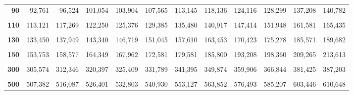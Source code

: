 \documentclass[
  11pt,
  ngerman,
  a4paper,
]{report}
\begin{document}
\begin{table}[H]
{\begin{tabular}{>{}r|rrrrrrrrrrr}
\textbf{90} & 92,761 & 96,524 & 101,054 & 103,904 & 107,565 & 113,145 & 118,136 & 124,116 & 128,299 & 137,208 & 140,782\\
\addlinespace
\textbf{\cellcolor{gray!6}{100}} & \cellcolor{gray!6}{102,946} & \cellcolor{gray!6}{106,906} & \cellcolor{gray!6}{111,667} & \cellcolor{gray!6}{114,659} & \cellcolor{gray!6}{118,498} & \cellcolor{gray!6}{124,342} & \cellcolor{gray!6}{129,561} & \cellcolor{gray!6}{135,807} & \cellcolor{gray!6}{140,169} & \cellcolor{gray!6}{149,449} & \cellcolor{gray!6}{153,167}\\
\textbf{110} & 113,121 & 117,269 & 122,250 & 125,376 & 129,385 & 135,480 & 140,917 & 147,414 & 151,948 & 161,581 & 165,435\\
\textbf{\cellcolor{gray!6}{120}} & \cellcolor{gray!6}{123,289} & \cellcolor{gray!6}{127,616} & \cellcolor{gray!6}{132,806} & \cellcolor{gray!6}{136,062} & \cellcolor{gray!6}{140,233} & \cellcolor{gray!6}{146,567} & \cellcolor{gray!6}{152,211} & \cellcolor{gray!6}{158,950} & \cellcolor{gray!6}{163,648} & \cellcolor{gray!6}{173,617} & \cellcolor{gray!6}{177,603}\\
\textbf{130} & 133,450 & 137,949 & 143,340 & 146,719 & 151,045 & 157,610 & 163,453 & 170,423 & 175,278 & 185,571 & 189,682\\
\textbf{\cellcolor{gray!6}{140}} & \cellcolor{gray!6}{143,604} & \cellcolor{gray!6}{148,269} & \cellcolor{gray!6}{153,854} & \cellcolor{gray!6}{157,352} & \cellcolor{gray!6}{161,827} & \cellcolor{gray!6}{168,613} & \cellcolor{gray!6}{174,648} & \cellcolor{gray!6}{181,840} & \cellcolor{gray!6}{186,847} & \cellcolor{gray!6}{197,451} & \cellcolor{gray!6}{201,683}\\
\addlinespace
\textbf{150} & 153,753 & 158,577 & 164,349 & 167,962 & 172,581 & 179,581 & 185,800 & 193,208 & 198,360 & 209,265 & 213,613\\
\textbf{\cellcolor{gray!6}{200}} & \cellcolor{gray!6}{204,434} & \cellcolor{gray!6}{209,985} & \cellcolor{gray!6}{216,609} & \cellcolor{gray!6}{220,744} & \cellcolor{gray!6}{226,021} & \cellcolor{gray!6}{233,994} & \cellcolor{gray!6}{241,058} & \cellcolor{gray!6}{249,445} & \cellcolor{gray!6}{255,264} & \cellcolor{gray!6}{267,541} & \cellcolor{gray!6}{272,423}\\
\textbf{300} & 305,574 & 312,346 & 320,397 & 325,409 & 331,789 & 341,395 & 349,874 & 359,906 & 366,844 & 381,425 & 387,203\\
\textbf{\cellcolor{gray!6}{400}} & \cellcolor{gray!6}{406,535} & \cellcolor{gray!6}{414,335} & \cellcolor{gray!6}{423,590} & \cellcolor{gray!6}{429,340} & \cellcolor{gray!6}{436,649} & \cellcolor{gray!6}{447,632} & \cellcolor{gray!6}{457,305} & \cellcolor{gray!6}{468,724} & \cellcolor{gray!6}{476,606} & \cellcolor{gray!6}{493,132} & \cellcolor{gray!6}{499,666}\\
\textbf{500} & 507,382 & 516,087 & 526,401 & 532,803 & 540,930 & 553,127 & 563,852 & 576,493 & 585,207 & 603,446 & 610,648\\
\bottomrule
\end{tabular}}
\end{table}
\end{document}
